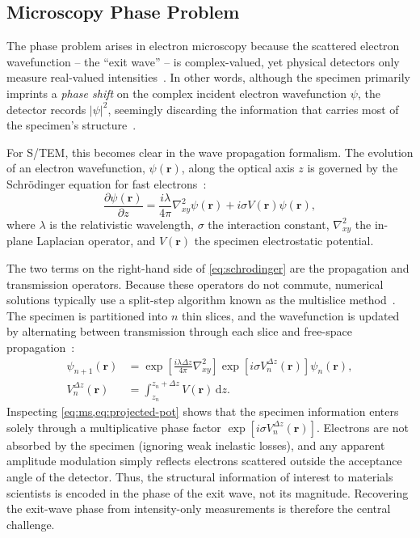 \documentclass[pdflatex,sn-aps,iicol]{sn-jnl}%
\begin{document}
\subsection{Microscopy Phase Problem}

The phase problem arises in electron microscopy because the scattered electron wavefunction -- the ``exit wave'' -- is complex-valued, yet physical detectors only measure real-valued intensities~\cite{Fienup_1982}.
In other words, although the specimen primarily imprints a \emph{phase shift} on the complex incident electron wavefunction $\psi$, the detector records $|\psi|^2$, seemingly discarding the information that carries most of the specimen's structure~\cite{born1954}.

For S/TEM, this becomes clear in the wave propagation formalism.
The evolution of an electron wavefunction, $\psi(\boldsymbol{r})$, along the optical axis $z$ is governed by the Schr\"odinger equation for fast electrons~\cite{Kirkland_2020}:
\begin{equation}
  \frac{\partial \psi(\boldsymbol{r})}{\partial z} = \frac{i \lambda}{4\pi}\nabla_{xy}^2 \psi(\boldsymbol{r})
  + i \sigma V(\boldsymbol{r}) \psi(\boldsymbol{r}),
  \label{eq:schrodinger}
\end{equation}
where $\lambda$ is the relativistic wavelength, $\sigma$ the interaction constant, $\nabla_{xy}^2$ the in-plane Laplacian operator, and $V(\boldsymbol{r})$ the specimen electrostatic potential.

The two terms on the right-hand side of \cref{eq:schrodinger} are the propagation and transmission operators.
Because these operators do not commute, numerical solutions typically use a split-step algorithm known as the multislice method~\cite{Cowley_1957}.
The specimen is partitioned into $n$ thin slices, and the wavefunction is updated by alternating between transmission through each slice and free-space propagation~\cite{Kirkland_2020}:
\begin{align}
  \psi_{n+1}(\boldsymbol{r}) &= \exp\!\left[\frac{i \lambda \Delta z}{4\pi}\nabla_{xy}^2\right]
  \exp\!\left[i \sigma V_n^{\Delta z}(\boldsymbol{r})\right] \psi_n(\boldsymbol{r}),
  \label{eq:ms} \\
  V_n^{\Delta z}(\boldsymbol{r}) &= \int_{z_n}^{z_n+\Delta z} V(\boldsymbol{r})\,\mathrm{d}z.
  \label{eq:projected-pot}
\end{align}
Inspecting \cref{eq:ms,eq:projected-pot} shows that the specimen information enters solely through a multiplicative phase factor $\exp\!\left[i \sigma V_n^{\Delta z}(\boldsymbol{r})\right]$.
Electrons are not absorbed by the specimen (ignoring weak inelastic losses), and any apparent amplitude modulation simply reflects electrons scattered outside the acceptance angle of the detector.
Thus, the structural information of interest to materials scientists is encoded in the phase of the exit wave, not its magnitude.
Recovering the exit-wave phase from intensity-only measurements is therefore the central challenge.
\end{document}
